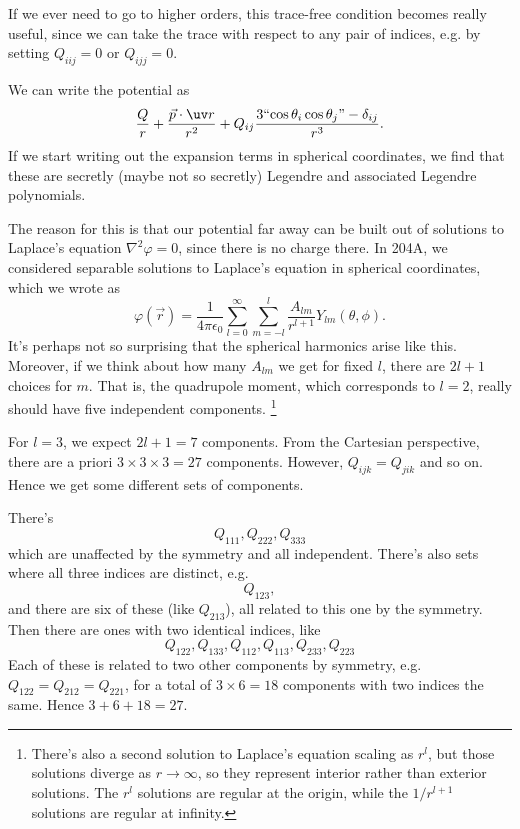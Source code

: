 If we ever need to go to higher orders, this trace-free condition becomes really useful, since we can take the trace with respect to any pair of indices, e.g. by setting $Q_{iij}=0$ or $Q_{ijj}=0$.

We can write the potential as
\begin{equation}
    \frac{Q}{r} + \frac{\vec p \cdot \uv r}{r^2} + Q_{ij} \frac{3 \text{``$\cos\theta_i \cos\theta_j$''} - \delta_{ij}}{r^3}.
\end{equation}
If we start writing out the expansion terms in spherical coordinates, we find that these are secretly (maybe not so secretly) Legendre and associated Legendre polynomials.

The reason for this is that our potential far away can be built out of solutions to Laplace's equation $\nabla^2 \varphi =0$, since there is no charge there. In 204A, we considered separable solutions to Laplace's equation in spherical coordinates, which we wrote as
\begin{equation}
    \varphi(\vec r) = \frac{1}{4\pi \epsilon_0} \sum_{l=0}^\infty \sum_{m=-l}^l \frac{A_{lm}}{r^{l+1}} Y_{lm}(\theta,\phi).
\end{equation}
It's perhaps not so surprising that the spherical harmonics arise like this. Moreover, if we think about how many $A_{lm}$ we get for fixed $l$, there are $2l+1$ choices for $m$. That is, the quadrupole moment, which corresponds to $l=2$, really should have five independent components.%
    \footnote{There's also a second solution to Laplace's equation scaling as $r^l$, but those solutions diverge as $r\to \infty$, so they represent interior rather than exterior solutions. The $r^l$ solutions are regular at the origin, while the $1/r^{l+1}$ solutions are regular at infinity.}

For $l=3$, we expect $2l+1=7$ components. From the Cartesian perspective, there are a priori $3\times 3 \times 3=27$ components. However, $Q_{ijk} = Q_{jik}$ and so on. Hence we get some different sets of components. 

There's 
\begin{equation}
    Q_{111},Q_{222},Q_{333}
\end{equation}
which are unaffected by the symmetry and all independent. There's also sets where all three indices are distinct, e.g. 
\begin{equation}
    Q_{123},
\end{equation}
and there are six of these (like $Q_{213}$), all related to this one by the symmetry. Then there are ones with two identical indices, like 
\begin{equation}
    Q_{122},Q_{133},Q_{112},Q_{113},Q_{233},Q_{223}
\end{equation}
Each of these is related to two other components by symmetry, e.g. $Q_{122}= Q_{212} = Q_{221}$, for a total of $3\times 6 =18$ components with two indices the same. Hence $3+6+18=27$.

